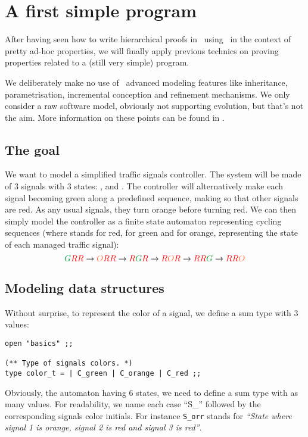 
\section{A first simple program}
After having seen how to write hierarchical proofs in \focal\ using
\zenon\ in the context of pretty ad-hoc properties, we will finally
apply previous technics on proving properties related to a (still very
simple) program.

We deliberately make no use of \focal\ advanced modeling features like
in\-he\-ri\-tan\-ce, parametrisation, incremental conception and refinement
mechanisms. We only consider a raw software model, obviously not
supporting evolution, but that's not the aim. More information on
these points can be found in \cite{FoCaLiZe-Tuto}.

\subsection{The goal}
We want to model a simplified traffic signals controller. The system will
be made of 3 signals with 3 states: ,  and
. The controller will alternatively make each signal becoming
green along a predefined sequence, making so that other signals are
red. As any usual signals, they turn orange before turning red. We can
then simply model the controller as a finite state automaton representing
cycling sequences (where  stands for red,  for green
and  for orange, representing the state of each managed traffic
signal):
$$\green{G}\red{R}\red{R} \rightarrow \orange{O}\red{R}\red{R}
\rightarrow \red{R}\green{G}\red{R} \rightarrow \red{R}\orange{O}\red{R}
\rightarrow \red{R}\red{R}\green{G} \rightarrow \red{R}\red{R}\orange{O}$$


\subsection{Modeling data structures}
Without surprise, to represent the color of a signal, we define a sum
type with 3 values:

{\scriptsize
\begin{lstlisting}
open "basics" ;;

(** Type of signals colors. *)
type color_t = | C_green | C_orange | C_red ;;
\end{lstlisting}}

Obviously, the automaton having 6 states, we need to define a sum type
with as many values. For readability, we name each case ``S\_''
followed by the corresponding signals color initials. For instance
\lstinline"S_orr" stands for {\em ``State where signal 1 is orange, signal
2 is red and signal 3 is red''}.

